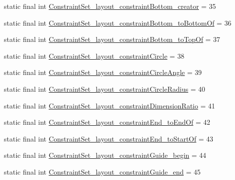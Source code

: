 \begin{DoxyCompactItemize}
static final int \mbox{\hyperlink{classandroid_1_1support_1_1constraint_1_1_r_1_1styleable_a4e95b420a306ecdf4474bd05ce0b043f}{Constraint\+Set\+\_\+layout\+\_\+constraint\+Bottom\+\_\+creator}} = 35
\item 
static final int \mbox{\hyperlink{classandroid_1_1support_1_1constraint_1_1_r_1_1styleable_a1eb15636a1d127a130fca9bb5bbb4f08}{Constraint\+Set\+\_\+layout\+\_\+constraint\+Bottom\+\_\+to\+Bottom\+Of}} = 36
\item 
static final int \mbox{\hyperlink{classandroid_1_1support_1_1constraint_1_1_r_1_1styleable_a8ceb5306b0e9b840a0d339b82418e7eb}{Constraint\+Set\+\_\+layout\+\_\+constraint\+Bottom\+\_\+to\+Top\+Of}} = 37
\item 
static final int \mbox{\hyperlink{classandroid_1_1support_1_1constraint_1_1_r_1_1styleable_ab8b2babfc7f31d1e5355dccdd78bb05d}{Constraint\+Set\+\_\+layout\+\_\+constraint\+Circle}} = 38
\item 
static final int \mbox{\hyperlink{classandroid_1_1support_1_1constraint_1_1_r_1_1styleable_a4f1ac2054a5d45c630ec1e0457777ba3}{Constraint\+Set\+\_\+layout\+\_\+constraint\+Circle\+Angle}} = 39
\item 
static final int \mbox{\hyperlink{classandroid_1_1support_1_1constraint_1_1_r_1_1styleable_af980088208ecc19515789d492ec9cfdc}{Constraint\+Set\+\_\+layout\+\_\+constraint\+Circle\+Radius}} = 40
\item 
static final int \mbox{\hyperlink{classandroid_1_1support_1_1constraint_1_1_r_1_1styleable_a007c70f1158cd29d299c5eaf7c45eb8a}{Constraint\+Set\+\_\+layout\+\_\+constraint\+Dimension\+Ratio}} = 41
\item 
static final int \mbox{\hyperlink{classandroid_1_1support_1_1constraint_1_1_r_1_1styleable_a65c534980499946880dea8ac1d597702}{Constraint\+Set\+\_\+layout\+\_\+constraint\+End\+\_\+to\+End\+Of}} = 42
\item 
static final int \mbox{\hyperlink{classandroid_1_1support_1_1constraint_1_1_r_1_1styleable_a5a2dff95d8c4b48b895c5f1985dcb24c}{Constraint\+Set\+\_\+layout\+\_\+constraint\+End\+\_\+to\+Start\+Of}} = 43
\item 
static final int \mbox{\hyperlink{classandroid_1_1support_1_1constraint_1_1_r_1_1styleable_a0ea403c2623f157080dd7066e51fe22f}{Constraint\+Set\+\_\+layout\+\_\+constraint\+Guide\+\_\+begin}} = 44
\item 
static final int \mbox{\hyperlink{classandroid_1_1support_1_1constraint_1_1_r_1_1styleable_a1adcedbf3b9511840a0e4fe0f1f429e8}{Constraint\+Set\+\_\+layout\+\_\+constraint\+Guide\+\_\+end}} = 45

\end{DoxyCompactItemize}

